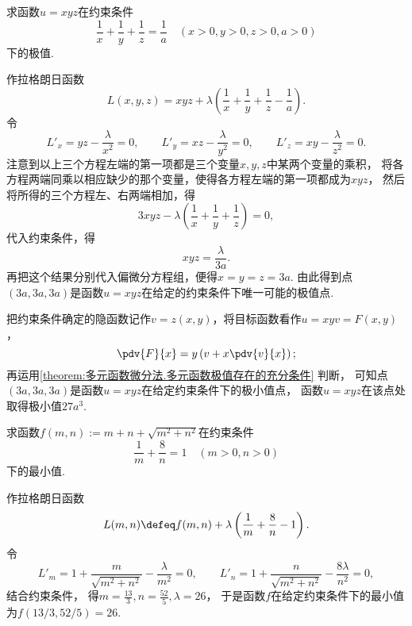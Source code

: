 \begin{example}
求函数\(u=xyz\)在约束条件\begin{equation*}
	\frac{1}{x}+\frac{1}{y}+\frac{1}{z}=\frac{1}{a}
	\quad(x>0,y>0,z>0,a>0)
\end{equation*}下的极值.
\begin{solution}
作拉格朗日函数\begin{equation*}
	L(x,y,z) = xyz+\lambda\left(\frac{1}{x}+\frac{1}{y}+\frac{1}{z}-\frac{1}{a}\right).
\end{equation*}
令\begin{equation*}
	L'_x = yz - \frac{\lambda}{x^2} = 0,
	\qquad
	L'_y = xz - \frac{\lambda}{y^2} = 0,
	\qquad
	L'_z = xy - \frac{\lambda}{z^2} = 0.
\end{equation*}
注意到以上三个方程左端的第一项都是三个变量\(x,y,z\)中某两个变量的乘积，
将各方程两端同乘以相应缺少的那个变量，使得各方程左端的第一项都成为\(xyz\)，
然后将所得的三个方程左、右两端相加，得\begin{equation*}
	3xyz - \lambda\left(\frac{1}{x}+\frac{1}{y}+\frac{1}{z}\right) = 0,
\end{equation*}
代入约束条件，得\begin{equation*}
	xyz = \frac{\lambda}{3a}.
\end{equation*}
再把这个结果分别代入偏微分方程组，便得\(x = y = z = 3a\).
由此得到点\((3a,3a,3a)\)是函数\(u = xyz\)在给定的约束条件下唯一可能的极值点.

把约束条件确定的隐函数记作\(v = z(x,y)\)，将目标函数看作\(u = xyv = F(x,y)\)，\begin{equation*}
	\pdv{F}{x} = y\left(v+x\pdv{v}{x}\right);
\end{equation*}
再运用\cref{theorem:多元函数微分法.多元函数极值存在的充分条件} 判断，
可知点\((3a,3a,3a)\)是函数\(u = xyz\)在给定约束条件下的极小值点，
函数\(u = xyz\)在该点处取得极小值\(27a^3\).
\end{solution}
\end{example}

\begin{example}
求函数\(f(m,n) := m + n + \sqrt{m^2 + n^2}\)在约束条件\begin{equation*}
	\frac1m + \frac8n = 1
	\quad(m>0,n>0)
\end{equation*}
下的最小值.
\begin{solution}
作拉格朗日函数\begin{equation*}
	L(m,n)
	\defeq
	f(m,n) + \lambda \left( \frac1m + \frac8n - 1 \right).
\end{equation*}
令\begin{equation*}
	L'_m
	= 1 + \frac{m}{\sqrt{m^2 + n^2}} - \frac{\lambda}{m^2}
	= 0,
	\qquad
	L'_n
	= 1 + \frac{n}{\sqrt{m^2 + n^2}} - \frac{8\lambda}{n^2}
	= 0,
\end{equation*}
结合约束条件，
得\(
	m = \frac{13}{3},
	n = \frac{52}{5},
	\lambda = 26
\)，
于是函数\(f\)在给定约束条件下的最小值为\(f(13/3,52/5) = 26\).
\end{solution}
\end{example}

